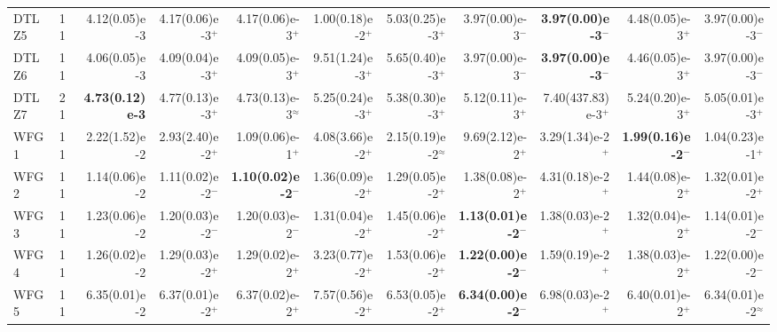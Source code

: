 \documentclass[pdflatex,sn-mathphys-ay]{sn-jnl}%
\theoremstyle{thmstyleone}%
\theoremstyle{thmstyletwo}%
\theoremstyle{thmstylethree}%
\begin{document}
\begin{landscape}
{\begin{longtable}{llrrrrrrrrr}
			DTLZ5                             & 11  & 4.12(0.05)e-3          & 4.17(0.06)e-3$^{+}$                & 4.17(0.06)e-3$^{+}$          & 1.00(0.18)e-2$^{+}$       & 5.03(0.25)e-3$^{+}$       & 3.97(0.00)e-3$^{-}$          & \textbf{3.97(0.00)e-3}$^{-}$ & 4.48(0.05)e-3$^{+}$          & 3.97(0.00)e-3$^{-}$         \\
			DTLZ6                             & 11  & 4.06(0.05)e-3          & 4.09(0.04)e-3$^{+}$                & 4.09(0.05)e-3$^{+}$          & 9.51(1.24)e-3$^{+}$       & 5.65(0.40)e-3$^{+}$       & 3.97(0.00)e-3$^{-}$          & \textbf{3.97(0.00)e-3}$^{-}$ & 4.46(0.05)e-3$^{+}$          & 3.97(0.00)e-3$^{-}$         \\
			DTLZ7                             & 21  & \textbf{4.73(0.12)e-3} & 4.77(0.13)e-3$^{+}$                & 4.73(0.13)e-3$^{\approx}$    & 5.25(0.24)e-3$^{+}$       & 5.38(0.30)e-3$^{+}$       & 5.12(0.11)e-3$^{+}$          & 7.40(437.83)e-3$^{+}$        & 5.24(0.20)e-3$^{+}$          & 5.05(0.01)e-3$^{+}$         \\
			\midrule
			WFG1                              & 11  & 2.22(1.52)e-2          & 2.93(2.40)e-2$^{+}$                & 1.09(0.06)e-1$^{+}$          & 4.08(3.66)e-2$^{+}$       & 2.15(0.19)e-2$^{\approx}$ & 9.69(2.12)e-2$^{+}$          & 3.29(1.34)e-2$^{+}$          & \textbf{1.99(0.16)e-2}$^{-}$ & 1.04(0.23)e-1$^{+}$         \\
			WFG2                              & 11  & 1.14(0.06)e-2          & 1.11(0.02)e-2$^{-}$                & \textbf{1.10(0.02)e-2}$^{-}$ & 1.36(0.09)e-2$^{+}$       & 1.29(0.05)e-2$^{+}$       & 1.38(0.08)e-2$^{+}$          & 4.31(0.18)e-2$^{+}$          & 1.44(0.08)e-2$^{+}$          & 1.32(0.01)e-2$^{+}$         \\
			WFG3                              & 11  & 1.23(0.06)e-2          & 1.20(0.03)e-2$^{-}$                & 1.20(0.03)e-2$^{-}$          & 1.31(0.04)e-2$^{+}$       & 1.45(0.06)e-2$^{+}$       & \textbf{1.13(0.01)e-2}$^{-}$ & 1.38(0.03)e-2$^{+}$          & 1.32(0.04)e-2$^{+}$          & 1.14(0.01)e-2$^{-}$         \\
			WFG4                              & 11  & 1.26(0.02)e-2          & 1.29(0.03)e-2$^{+}$                & 1.29(0.02)e-2$^{+}$          & 3.23(0.77)e-2$^{+}$       & 1.53(0.06)e-2$^{+}$       & \textbf{1.22(0.00)e-2}$^{-}$ & 1.59(0.19)e-2$^{+}$          & 1.38(0.03)e-2$^{+}$          & 1.22(0.00)e-2$^{-}$         \\
			WFG5                              & 11  & 6.35(0.01)e-2          & 6.37(0.01)e-2$^{+}$                & 6.37(0.02)e-2$^{+}$          & 7.57(0.56)e-2$^{+}$       & 6.53(0.05)e-2$^{+}$       & \textbf{6.34(0.00)e-2}$^{-}$ & 6.98(0.03)e-2$^{+}$          & 6.40(0.01)e-2$^{+}$          & 6.34(0.01)e-2$^{\approx}$   \\

\end{longtable}}
\end{landscape}
\end{document}
